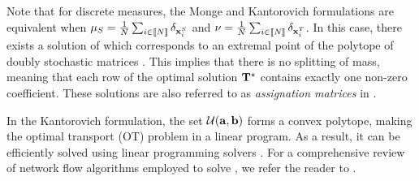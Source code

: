 Note that for discrete measures, the Monge and Kantorovich formulations are equivalent when $\mu_S = \frac{1}{N} \sum_{i \in {[\![N]\!]}} \delta_{{\mathbf{x}}^S_i}$ and $\nu = \frac{1}{N} \sum_{i \in {[\![N]\!]}} \delta_{{\mathbf{x}}^T_i}$. In this case, there exists a solution of  which corresponds to an extremal point of the polytope of doubly stochastic matrices \citep{bertsimas1997introduction}. This implies that there is no splitting of mass, meaning that each row of the optimal solution ${\mathbf{T}}^\star$ contains exactly one non-zero coefficient. These solutions are also referred to as \emph{assignation matrices} in .

In the Kantorovich formulation, the set ${\mathcal{U}}({\mathbf{a}}, {\mathbf{b}})$ forms a convex polytope, making the optimal transport (OT) problem in  a linear program. As a result, it can be efficiently solved using linear programming solvers \citep{dantzig2016linear}. For a comprehensive review of network flow algorithms employed to solve , we refer the reader to \citep{peyre2019computational}.

